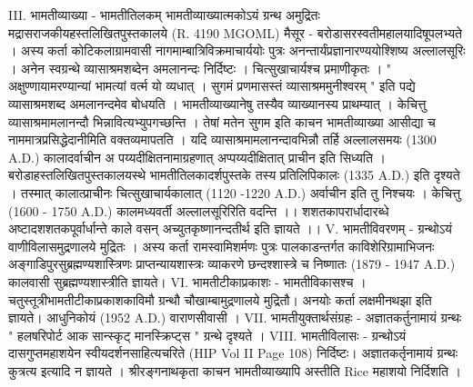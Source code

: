 III.  भामतीव्याख्या - भामतीतिलकम् 
भामतीव्याख्यात्मकोऽयं ग्रन्थ अमुद्रितः मद्रासराजकीयहस्तलिखितपुस्तकालये (R. 4190 MGOML) मैसूर - बरोडासरस्वतीमहालयादिषूपलभ्यते । अस्य कर्ता कोटिकलाग्रामवासी नागमाम्बात्रिविक्रमाचार्ययोः पुत्रः अनन्तार्यंप्रज्ञानारण्ययोश्शिष्य अल्लालसूरिः । अनेन स्वग्रन्थे व्यासाश्रमशब्देन अमलानन्दः निर्दिष्टः । चित्सुखाचार्यश्च प्रमाणीकृतः । " अक्षुण्णायामरण्यान्यां भामत्यां वर्त्म यो व्यधात् । सुगमं प्रणमासस्तं व्यासाश्रममुनीश्वरम् " इति पद्ये व्यासाश्रमशब्द अमलानन्दमेव बोधयति । भामतीव्याख्यानेषु तस्यैव व्याख्यानस्य प्राथम्यात् । केचित्तु व्यासाश्रमामलानन्दौ भिन्नावित्यभ्युपगच्छन्ति । तेषां मतेन सुगम इति काचन भामतीव्याख्या आसीद्या च नाममात्रप्रसिद्धेदानीमिति वक्तव्यमापतति । 
यदि व्यासाश्रमामलानन्दावभिन्नौ तर्हि अल्लालसमयः (1300 A.D.) कालादर्वाचीन अ पय्यदीक्षितनामाग्रहणात् अप्पय्यदीक्षितात् प्राचीन इति सिध्यति । बरोडाहस्तलिखितपुस्तकालयस्थे भामतीतिलकादर्शपुस्तके तस्य प्रतिलिपिकालः (1335 A.D.) इति दृश्यते । तस्मात् कालात्प्राचीनः चित्सुखाचार्यकालात् (1120 -1220 A.D.) अर्वाचीन इति तु निश्चयः । केचित्तु (1600 - 1750 A.D.)  कालमध्यवर्ती अल्लालसूरिरिति वदन्ति ।। शशतकापरार्धादारब्धे अष्टादशशतकपूर्वार्धान्ते काले वसन् अच्युतकृष्णानन्दतीर्थ इति ज्ञायते ।।
V. भामतीविवरणम् - 
ग्रन्थोऽयं वाणीविलासमुद्रणालये मुद्रितः । अस्य कर्ता रामस्वामिशर्मणः पुत्रः पालकाडन्तर्गत काविशेरिग्रामाभिजनः अङ्गाडिपुरसुब्रह्मण्यशास्त्रिणः प्राप्तन्यायशास्त्रः व्याकरणे छन्दश्शास्त्रे च निष्णातः (1879 - 1947 A.D.) कालवासी सुब्रह्मण्यशास्त्रीति ज्ञायते। 
VI. भामतीटीकाप्रकाशः - भामतीविकासश्च ।
चतुस्तूत्रीभामतीटीकाप्रकाशकाविमौ ग्रन्थौ चौखाम्बामुद्रणालये मुद्रितौ। अनयोः कर्ता लक्षमीनथझा इति ज्ञायते। आधुनिकोयं (1952 A.D.) वाराणसीवासी ।
VII. भामतीयुक्तार्थसंग्रहः -
अज्ञातकर्तुनामायं ग्रन्थः " हलषरिपोर्ट आक सान्स्कृट् मानस्क्रिप्ट्स " ग्रन्थे दृश्यते ।  
VIII. भामतीविलासः -
ग्रन्थोऽयं दासगुप्तमहाशयेन स्वीयदर्शनसाहित्यचरिते (HIP Vol II Page 108) निर्दिष्टः। अज्ञातकर्तृनामायं ग्रन्थः कुत्रत्य इत्यादि न ज्ञायते । श्रीरङ्गनाथकृता काचन भामतीव्याख्यापि अस्तीति Rice महाशयो निर्दिशति । 


